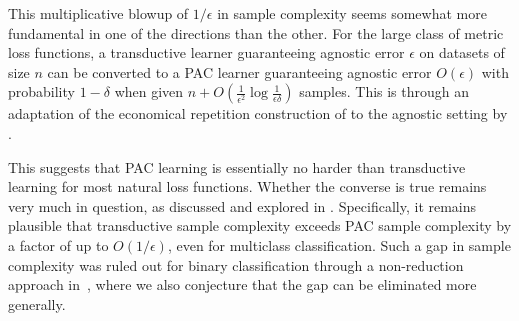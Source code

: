 This multiplicative blowup of $1/\epsilon$ in sample complexity seems somewhat more fundamental in one of the directions than the other.  For the large class of metric loss functions, a transductive learner guaranteeing agnostic error $\epsilon$ on datasets of size $n$ can be converted to a PAC learner guaranteeing agnostic error $O(\epsilon)$ with probability $1-\delta$ when given $n+O\left(\frac{1}{\epsilon^2} \log \frac{1}{\epsilon\delta}\right)$ samples. This is through an adaptation of the economical repetition construction of \citet{aden-ali_optimal_2023} to the agnostic setting by  \citet{dughmi_is_2024}.

This suggests that PAC learning is essentially no harder than transductive learning for most natural loss functions. Whether the converse is true remains very much in question,  as discussed and explored in \cite{dughmi_is_2024}. Specifically, it remains plausible that transductive sample complexity exceeds PAC sample complexity by a factor of up to $O(1/\epsilon)$, even for multiclass classification. Such a gap in sample complexity was ruled out for binary classification through a non-reduction approach in~\cite{dughmi_is_2024}, where we also conjecture that the gap can be  eliminated more generally.









